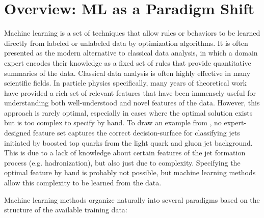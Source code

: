 
\section{Overview: ML as a Paradigm Shift}
\label{sec:ml-overview}

Machine learning is a set of techniques that allow rules or behaviors to be learned directly from labeled or unlabeled data by optimization algorithms.
It is often presented as the modern alternative to classical data analysis, in which a domain expert encodes their knowledge as a fixed set of rules that provide quantitative summaries of the data.
Classical data analysis is often highly effective in many scientific fields.
In particle physics specifically, many years of theoretical work have provided a rich set of relevant features that have been immensely useful for understanding both well-understood and novel features of the data.
However, this approach is rarely optimal, especially in cases where the optimal solution exists but is too complex to specify by hand.
To draw an example from , no expert-designed feature set captures the correct decision-surface for classifying jets initiated by boosted top quarks from the light quark and gluon jet background.
This is due to a lack of knowledge about certain features of the jet formation process (e.g. hadronization), but also just due to complexity.
Specifying the optimal feature by hand is probably not possible, but machine learning methods allow this complexity to be learned from the data.

Machine learning methods organize naturally into several paradigms based on the structure of the available training data:

